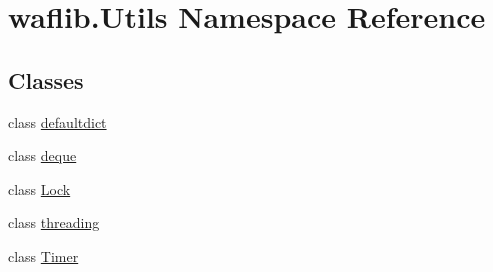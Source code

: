 \hypertarget{namespacewaflib_1_1_utils}{}\section{waflib.\+Utils Namespace Reference}
\label{namespacewaflib_1_1_utils}
\subsection*{Classes}
\begin{DoxyCompactItemize}
\item 
class \hyperlink{classwaflib_1_1_utils_1_1defaultdict}{defaultdict}
\item 
class \hyperlink{classwaflib_1_1_utils_1_1deque}{deque}
\item 
class \hyperlink{classwaflib_1_1_utils_1_1_lock}{Lock}
\item 
class \hyperlink{classwaflib_1_1_utils_1_1threading}{threading}
\item 
class \hyperlink{classwaflib_1_1_utils_1_1_timer}{Timer}
\end{DoxyCompactItemize}
